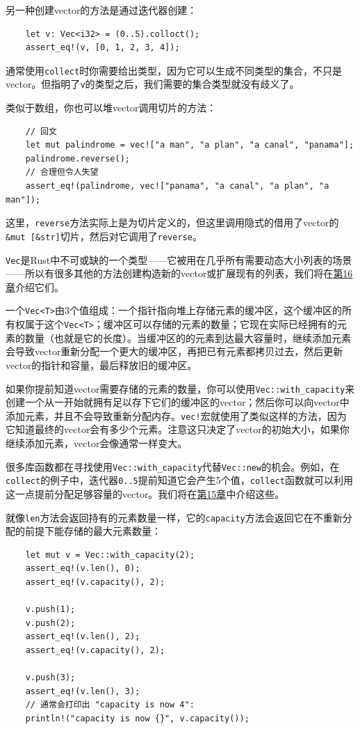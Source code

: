 另一种创建vector的方法是通过迭代器创建：
\begin{verbatim}
    let v: Vec<i32> = (0..5).colloct();
    assert_eq!(v, [0, 1, 2, 3, 4]);
\end{verbatim}

通常使用\texttt{collect}时你需要给出类型，因为它可以生成不同类型的集合，不只是vector。但指明了\texttt{v}的类型之后，我们需要的集合类型就没有歧义了。

类似于数组，你也可以堆vector调用切片的方法：
\begin{verbatim}
    // 回文
    let mut palindrome = vec!["a man", "a plan", "a canal", "panama"];
    palindrome.reverse();
    // 合理但令人失望
    assert_eq!(palindrome, vec!["panama", "a canal", "a plan", "a man"]);
\end{verbatim}

这里，\texttt{reverse}方法实际上是为切片定义的，但这里调用隐式的借用了vector的\texttt{\&mut [\&str]}切片，然后对它调用了\texttt{reverse}。

\texttt{Vec}是Rust中不可或缺的一个类型——它被用在几乎所有需要动态大小列表的场景——所以有很多其他的方法创建构造新的vector或扩展现有的列表，我们将在\hyperref[ch16]{第16章}介绍它们。

一个\texttt{Vec<T>}由3个值组成：一个指针指向堆上存储元素的缓冲区，这个缓冲区的所有权属于这个\texttt{Vec<T>}；缓冲区可以存储的元素的数量；它现在实际已经拥有的元素的数量（也就是它的长度）。当缓冲区的的元素到达最大容量时，继续添加元素会导致vector重新分配一个更大的缓冲区，再把已有元素都拷贝过去，然后更新vector的指针和容量，最后释放旧的缓冲区。

如果你提前知道vector需要存储的元素的数量，你可以使用\texttt{Vec::with\_capacity}来创建一个从一开始就拥有足以存下它们的缓冲区的vector；然后你可以向vector中添加元素，并且不会导致重新分配内存。\texttt{vec!}宏就使用了类似这样的方法，因为它知道最终的vector会有多少个元素。注意这只决定了vector的初始大小，如果你继续添加元素，vector会像通常一样变大。

很多库函数都在寻找使用\texttt{Vec::with\_capacity}代替\texttt{Vec::new}的机会。例如，在\texttt{collect}的例子中，迭代器\texttt{0..5}提前知道它会产生5个值，\texttt{collect}函数就可以利用这一点提前分配足够容量的vector。我们将在\hyperref[ch15]{第15章}中介绍这些。

就像\texttt{len}方法会返回持有的元素数量一样，它的\texttt{capacity}方法会返回它在不重新分配的前提下能存储的最大元素数量：
\begin{verbatim}
    let mut v = Vec::with_capacity(2);
    assert_eq!(v.len(), 0);
    assert_eq!(v.capacity(), 2);

    v.push(1);
    v.push(2);
    assert_eq!(v.len(), 2);
    assert_eq!(v.capacity(), 2);

    v.push(3);
    assert_eq!(v.len(), 3);
    // 通常会打印出 "capacity is now 4":
    println!("capacity is now {}", v.capacity());
\end{verbatim}

